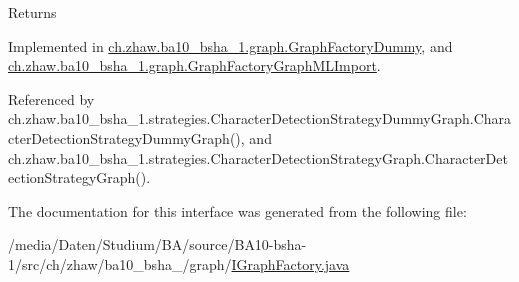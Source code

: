 \begin{DoxyReturn}{Returns}

\end{DoxyReturn}


Implemented in \hyperlink{classch_1_1zhaw_1_1ba10__bsha__1_1_1graph_1_1GraphFactoryDummy_aee963953d9d848498caf25bf30cbe8bf}{ch.zhaw.ba10\_\-bsha\_\-1.graph.GraphFactoryDummy}, and \hyperlink{classch_1_1zhaw_1_1ba10__bsha__1_1_1graph_1_1GraphFactoryGraphMLImport_a2936d100be1654461056080ff61edd32}{ch.zhaw.ba10\_\-bsha\_\-1.graph.GraphFactoryGraphMLImport}.

Referenced by ch.zhaw.ba10\_\-bsha\_\-1.strategies.CharacterDetectionStrategyDummyGraph.CharacterDetectionStrategyDummyGraph(), and ch.zhaw.ba10\_\-bsha\_\-1.strategies.CharacterDetectionStrategyGraph.CharacterDetectionStrategyGraph().

The documentation for this interface was generated from the following file:\begin{DoxyCompactItemize}
\item 
/media/Daten/Studium/BA/source/BA10-\/bsha-\/1/src/ch/zhaw/ba10\_\-bsha\_/graph/\hyperlink{IGraphFactory_8java}{IGraphFactory.java}\end{DoxyCompactItemize}
